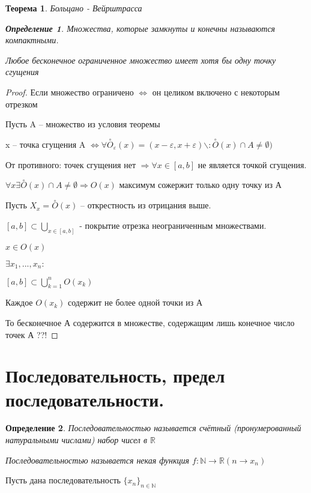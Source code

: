 \documentclass{book}
\newtheorem{Def}{Определение}[chapter]
\newtheorem{Th}{Теорема}[chapter]
\begin{document}
\begin{Th}
	Больцано - Вейрштрасса
	\begin{Def}
	Множества, которые замкнуты и конечны называются компактными.
	\end{Def}
	
	Любое бесконечное ограниченное множество имеет хотя бы одну точку сгущения
\end{Th}
\begin{proof}
	Если множество ограничено $\Leftrightarrow$ он целиком включено с некоторым отрезком
	
	Пусть A -- множество из условия теоремы
	
	x -- точка сгущения A $\Leftrightarrow \forall \overset{\circ}{O}_{\varepsilon}(x)= (x-\varepsilon, x+\varepsilon)\backslash : \overset{\circ}{O}(x) \cap A \neq \emptyset)$
	
	От противного: точек сгущения нет $\Rightarrow \forall x \in [a, b]$ не является точкой сгущения.
	
	$\forall x \exists \overset{\circ}{O}(x) \cap A \neq \emptyset \Rightarrow O(x)$ максимум сожержит только одну точку из А 
	
	Пусть $X_x = \overset{\circ}{O}(x)$ -- открестность из отрицания выше.
	
	$[a, b] \subset \bigcup_{x\in [a, b]}$ - покрытие отрезка неограниченным множествами.
	
	$x\in O(x)$
	
	$\exists x_1, ..., x_n:$
	
	$[a, b] \subset \bigcup_{k=1}^nO(x_k)$
	
	Каждое $O(x_k)$ содержит не более одной точки из А
	
	То бесконечное А содержится в множестве, содержащим лишь конечное число точек А ??!
\end{proof}
\section{
Последовательность, предел последовательности.}

\begin{Def}
	Последовательностью называется счётный (пронумерованный натуральными числами) набор чисел в $\mathds{R}$
	
	Последовательностью называется некая функция $f:\mathds{N}\rightarrow \mathds{R} (n\rightarrow x_n)$
\end{Def}

Пусть дана последовательность $\{x_n\}_{n\in \mathds{N}}$
\end{document}
